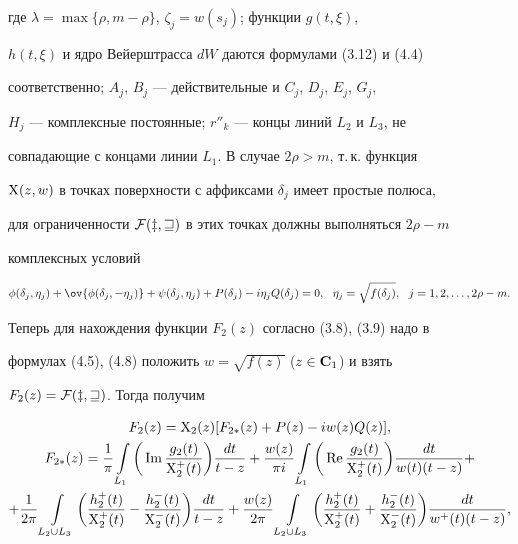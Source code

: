 где $\lambda=\max\{\rho,m-\rho\}$, $\zeta_j=w(s_j)$; функции $g(t,\xi)$, 


$h(t,\xi)$ и ядро Вейерштрасса $dW$ даются формулами (3.12) и (4.4) 


соответственно; $A_j$, $B_j$ --- действительные и $C_j$, $D_j$, $E_j$, $G_j$, 


$H_j$ --- комплексные постоянные; $r''_k$ --- концы линий $L_2$ и $L_3$, не 


совпадающие с концами линии $L_1$. В случае $2\rho>m$, т.\,к. функция 


$\mathrm X(z,w)$ в точках поверхности с аффиксами $\delta_j$ имеет простые полюса, 


для ограниченности $\cal F(z,w)$ в этих точках должны выполняться $2\rho-m$ 


комплексных условий 


\begin{equation} 


\phi(\delta_j,\eta_j)+\ov{\phi(\delta_j,-\eta_j)}+ 


\psi(\delta_j,\eta_j)+P(\delta_j)-i\eta_j Q(\delta_j)=0,\ \ 


\eta_j=\sqrt{f(\delta_j)},\ \ j=1,2,\dotsc,2\rho-m. 


\end{equation} 


 


Теперь для нахождения функции $F_2(z)$ согласно (3.8), (3.9) надо в 


формулах (4.5), (4.8) положить $w=\sqrt{f(z)}$ ($z\in\bold C_1$) и взять 


$F_2(z)=\cal F(z,w)$. Тогда получим 


\begin{gather} 


F_2(z)=\X_2(z)[F_{2\ast}(z)+P(z)-i w(z)Q(z)],\\ 


%


F_{2\ast}(z)=\frac{1}{\pi}\int\limits_{L_1}\bigg(\im 


\frac{g_2(t)}{\X^+_2(t)} \bigg)\frac{dt}{t-z}+\frac{w(z)}{\pi i} 


\int\limits_{L_1}\bigg(\re\frac{g_2(t)}{\X^+_2(t)} \bigg) 


\frac{dt}{w(t)(t-z)}+\notag \\ 


%


+\frac{1}{2\pi}\int\limits_{L_2\cup L_3}\bigg( 


\frac{h_2^+(t)}{\X^+_2(t)}-\frac{h_2^-(t)}{\X^-_2(t)}\bigg) 


\frac{dt}{t-z}+\frac{w(z)}{2\pi}\int\limits_{L_2\cup L_3}\bigg( 


\frac{h_2^+(t)}{\X^+_2(t)}+\frac{h_2^-(t)}{\X^-_2(t)}\bigg) 


\frac{dt}{w^+(t)(t-z)},\notag 


\end{gather} 


